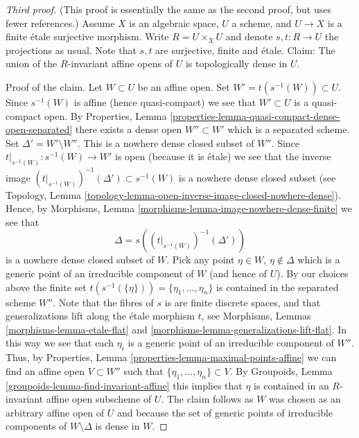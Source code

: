 \documentclass{stacks-project}
\theoremstyle{plain}
\theoremstyle{definition}
\theoremstyle{remark}
\numberwithin{equation}{subsection}
\begin{document}
\begin{proof}[Third proof]
(This proof is essentially the same as the second proof, but uses
fewer references.)
Assume $X$ is an algebraic space, $U$ a scheme, and $U \to X$ is a finite
\'etale surjective morphism. Write $R = U \times_X U$ and denote
$s, t : R \to U$ the projections as usual. Note that $s, t$ are surjective,
finite and \'etale. Claim: The union of the $R$-invariant affine opens of
$U$ is topologically dense in $U$.

\medskip\noindent
Proof of the claim. Let $W \subset U$ be an affine open.
Set $W' = t(s^{-1}(W)) \subset U$. Since $s^{-1}(W)$ is affine
(hence quasi-compact) we see that $W' \subset U$ is a quasi-compact open. By
Properties, Lemma \ref{properties-lemma-quasi-compact-dense-open-separated}
there exists a dense open $W'' \subset W'$ which is a separated scheme.
Set $\Delta' = W' \setminus W''$. This is a nowhere dense closed subset of
$W''$. Since $t|_{s^{-1}(W)} : s^{-1}(W) \to W'$ is open (because it is \'etale)
we see that the inverse image
$(t|_{s^{-1}(W)})^{-1}(\Delta') \subset s^{-1}(W)$
is a nowhere dense closed subset (see
Topology, Lemma \ref{topology-lemma-open-inverse-image-closed-nowhere-dense}).
Hence, by
Morphisms, Lemma \ref{morphisms-lemma-image-nowhere-dense-finite}
we see that
$$
\Delta = s\left((t|_{s^{-1}(W)})^{-1}(\Delta')\right)
$$
is a nowhere dense closed subset of $W$. Pick any point $\eta \in W$,
$\eta \not \in \Delta$ which is a generic point of an irreducible
component of $W$ (and hence of $U$). By our choices above the finite set
$t(s^{-1}(\{\eta\})) = \{\eta_1, \ldots, \eta_n\}$
is contained in the separated scheme $W''$.
Note that the fibres of $s$ is are finite discrete spaces, and that
generalizations lift along the \'etale morphism $t$, see
Morphisms, Lemmas \ref{morphisms-lemma-etale-flat}
and \ref{morphisms-lemma-generalizations-lift-flat}.
In this way we see that each $\eta_i$ is a generic point of an
irreducible component of $W''$. Thus, by
Properties, Lemma \ref{properties-lemma-maximal-points-affine}
we can find an affine open $V \subset W''$ such that
$\{\eta_1, \ldots, \eta_n\} \subset V$.
By
Groupoids, Lemma \ref{groupoids-lemma-find-invariant-affine}
this implies that $\eta$ is contained in an $R$-invariant affine
open subscheme of $U$. The claim follows as $W$ was chosen as an
arbitrary affine open of $U$ and because the set of generic points
of irreducible components of $W \setminus \Delta$ is dense in $W$.


\end{proof}
\end{document}
